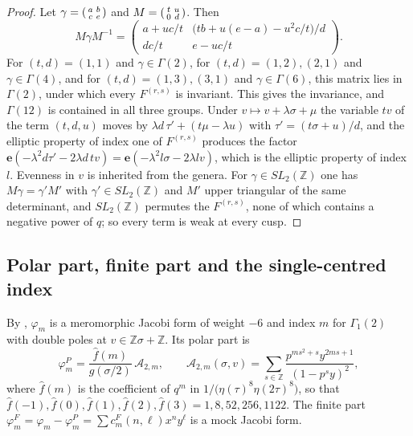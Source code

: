 \documentclass[11pt]{amsart}
\theoremstyle{definition}
\newcommand{\ZZ}{\mathbb{Z}}
\newcommand{\e}{\mathbf e}
\begin{document}
\begin{proof}
Let $\gamma=\begin{psmallmatrix}a&b\\c&e\end{psmallmatrix}$ and $M=\begin{psmallmatrix}t&u\\0&d\end{psmallmatrix}$. Then
\[
M\gamma M^{-1}=\begin{pmatrix}a+uc/t&\big(tb+u(e-a)-u^2c/t\big)/d\\ dc/t&e-uc/t\end{pmatrix}.
\]
For $(t,d)=(1,1)$ and $\gamma\in\Gamma(2)$, for $(t,d)=(1,2),(2,1)$ and $\gamma\in\Gamma(4)$, and for $(t,d)=(1,3),(3,1)$ and $\gamma\in\Gamma(6)$, this matrix lies in $\Gamma(2)$, under which every $F^{(r,s)}$ is invariant. This gives the invariance, and $\Gamma(12)$ is contained in all three groups. Under $v\mapsto v+\lambda\sigma+\mu$ the variable $tv$ of the term $(t,d,u)$ moves by $\lambda d\,\tau'+(t\mu-\lambda u)$ with $\tau'=(t\sigma+u)/d$, and the elliptic property of index one of $F^{(r,s)}$ produces the factor $\e(-\lambda^2d\tau'-2\lambda d\,tv)=\e(-\lambda^2l\sigma-2\lambda lv)$, which is the elliptic property of index $l$. Evenness in $v$ is inherited from the genera. For $\gamma\in SL_2(\ZZ)$ one has $M\gamma=\gamma'M'$ with $\gamma'\in SL_2(\ZZ)$ and $M'$ upper triangular of the same determinant, and $SL_2(\ZZ)$ permutes the $F^{(r,s)}$, none of which contains a negative power of $q$; so every term is weak at every cusp.
\end{proof}

\subsection{Polar part, finite part and the single-centred index}
By \cite[Theorem~5.2]{BSS25}, $\varphi_m$ is a meromorphic Jacobi form of weight $-6$ and index $m$ for $\Gamma_1(2)$ with double poles at $v\in\ZZ\sigma+\ZZ$. Its polar part is \cite[(5.45)]{BSS25}
\begin{equation}\label{eq:polar}
\varphi_m^P=\frac{\hat f(m)}{g(\sigma/2)}\,\mathcal A_{2,m},\qquad \mathcal A_{2,m}(\sigma,v)=\sum_{s\in\ZZ}\frac{p^{ms^2+s}y^{2ms+1}}{(1-p^sy)^2},
\end{equation}
where $\hat f(m)$ is the coefficient of $q^m$ in $1/\big(\eta(\tau)^8\eta(2\tau)^8\big)$, so that $\hat f(-1),\hat f(0),\hat f(1),\hat f(2),\hat f(3)=1,8,52,256,1122$. The finite part $\varphi_m^F=\varphi_m-\varphi_m^P=\sum c^F_m(n,\ell)x^ny^\ell$ is a mock Jacobi form.
\end{document}
